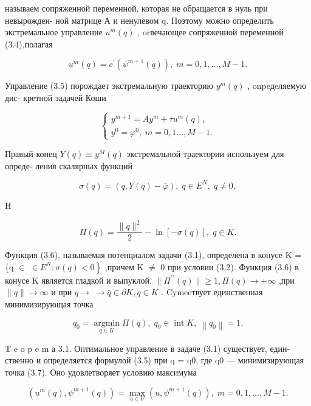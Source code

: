\documentclass[10pt]{article}
\begin{document}
называем сопряженной переменной, которая не обращается в нуль при невырожден- ной матрице А и ненулевом q. Поэтому можно определить экстремальное управление \({u}^{m}\left( q\right)\) , orвечающее сопряженной переменной (3.4),полагая

\[
{u}^{m}\left( q\right)  = {c}^{\prime }\left( {{\psi }^{m + 1}\left( q\right) }\right) ,\;m = 0,1,\ldots ,M - 1. \tag{3.5}
\]

Управление (3.5) порождает экстремальную траекторию \({y}^{m}\left( q\right)\) , onpeдeляемую дис- кретной задачей Коши

\[
\left\{  \begin{array}{l} {y}^{m + 1} = A{y}^{m} + \tau {u}^{m}\left( q\right) , \\  {y}^{0} = {\varphi }^{0},\;m = 0,1\ldots ,M - 1. \end{array}\right.
\]

Правый конец \(Y\left( q\right)  \equiv  {y}^{M}\left( q\right)\) экстремальной траектории используем для опреде- ления скалярных функций

\[
\sigma \left( q\right)  = \left( {q,Y\left( q\right)  - \overline{\varphi }}\right) ,\;q \in  {E}^{N},\;q \neq  0,
\]

H

\[
\Pi \left( q\right)  = \frac{\parallel q{\parallel }^{2}}{2} - \ln \left[  {-\sigma \left( q\right) }\right]  ,\;q \in  K. \tag{3.6}
\]

Функция (3.6), называемая потенциалом задачи (3.1), определена в конусе K = \{q \(\in\) \(\left. { \in  {E}^{N} : \sigma \left( q\right)  < 0}\right\}\) ,причем K \(\neq\) 0 при условии (3.2). Функция (3.6) в конусе K является гладкой и выпуклой, \(\parallel {\Pi }^{\prime \prime }\left( q\right) \parallel  \geq  1,\Pi \left( q\right)  \rightarrow   + \infty\) ,при \(\parallel q\parallel  \rightarrow  \infty\) и при \(q \rightarrow \; \rightarrow  \bar{q} \in  \partial K,q \in  K\) . Cymecтвует единственная минимизирующая точка

\[
{q}_{0} = \mathop{\operatorname{argmin}}\limits_{{q \in  K}}\Pi \left( q\right) ,\;{q}_{0} \in  \operatorname{int}K,\;\left\lVert {q}_{0} \right\rVert = 1. \tag{3.7}
\]

T e o p e m а 3.1. Оптимальное управление в задаче (3.1) существует, един- ственно и определяется формулой (3.5) при q = q0, где q0 — минимизирующая точка (3.7). Оно удовлетворяет условию максимума

\[
\left( {{u}^{m}\left( q\right) ,{\psi }^{m + 1}\left( q\right) }\right)  = \mathop{\max }\limits_{{u \in  U}}\left( {u,{\psi }^{m + 1}\left( q\right) }\right) ,\;m = 0,1,\ldots ,M - 1.
\]
\end{document}
